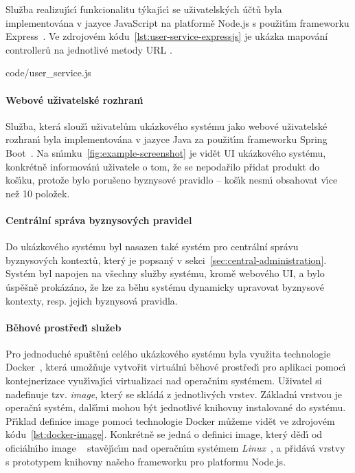 Služba realizuj\'{\i}c\'{\i} funkcionalitu t\'ykaj\'{\i}c\'{\i} se uživatelsk\'ych účtů byla
implementována v jazyce JavaScript na platformě Node.js s použit\'{\i}m
frameworku Express~\cite{expressjs}. Ve zdrojovém kódu~\ref{lst:user-service-expressjs}
je ukázka mapování controllerů na jednotlivé metody \gls{URL} .


{code/user_service.js}

\paragraph{Webové uživatelské rozhran\'{\i}}

Služba, která slouž\'{\i} uživatelům ukázkového systému jako webové uživatelské
rozhran\'{\i} byla implementována v jazyce Java za použit\'{\i}m frameworku Spring Boot~\cite{springboot}.
Na sn\'{\i}mku~\ref{fig:example-screenshot} je vidět UI ukázkového systému,
konkrétně informován\'{\i} uživatele o tom, že se nepodařilo přidat produkt
do koš\'{\i}ku, protože bylo porušeno byznysové pravidlo – koš\'{\i}k nesm\'{\i} obsahovat
v\'{\i}ce než 10 položek.

\paragraph{Centrální správa byznysových pravidel}

Do ukázkového systému byl nasazen také systém pro centrální správu byznysových kontextů,
který je popsaný v sekci~\ref{sec:central-administration}. Systém byl napojen na všechny
služby systému, kromě webového \gls{UI}, a bylo úspěšně prokázáno, že lze za běhu systému
dynamicky upravovat byznysové kontexty, resp. jejich byznysová pravidla.

\paragraph{Běhové prostřed\'{\i} služeb}
Pro jednoduché spuštěn\'{\i} celého ukázkového systému byla využita technologie
Docker~\cite{merkel2014docker}, která umožňuje vytvořit virtuáln\'{\i} běhové prostřed\'{\i}
pro aplikaci pomoc\'{\i} kontejnerizace využ\'{\i}vaj\'{\i}c\'{\i} virtualizaci nad operačn\'{\i}m systémem.
Uživatel si nadefinuje tzv. \textit{image}, kter\'y se skládá z jednotliv\'ych vrstev.
Základn\'{\i} vrstvou je operačn\'{\i} systém, dalš\'{\i}mi mohou b\'yt jednotlivé knihovny instalované do systému.
Př\'{\i}klad definice image pomoc\'{\i} technologie Docker můžeme vidět ve zdrojovém
kódu~\ref{lst:docker-image}. Konkrétně se jedná o definici image, kter\'y
děd\'{\i} od oficiáln\'{\i}ho image ~\cite{dockernodeimage}
stavěj\'{\i}c\'{\i}m nad operačn\'{\i}m systémem \textit{Linux}~\cite{linux},
a přidává vrstvy s prototypem knihovny našeho frameworku pro platformu Node.js.

